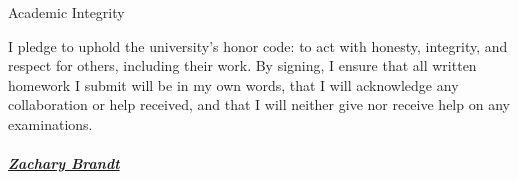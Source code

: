 \begin{homeworkProblem}{Academic Integrity}
    
    I pledge to uphold the university’s honor code: to act with honesty, 
    integrity, and respect for others, including their work. By signing, I 
    ensure that all written homework I submit will be in my own words, that 
    I will acknowledge any collaboration or help received, and that I will 
    neither give nor receive help on any examinations. 
    \\ \\ 
    \underline{\textbf{\textit{Zachary Brandt}}}
\end{homeworkProblem}